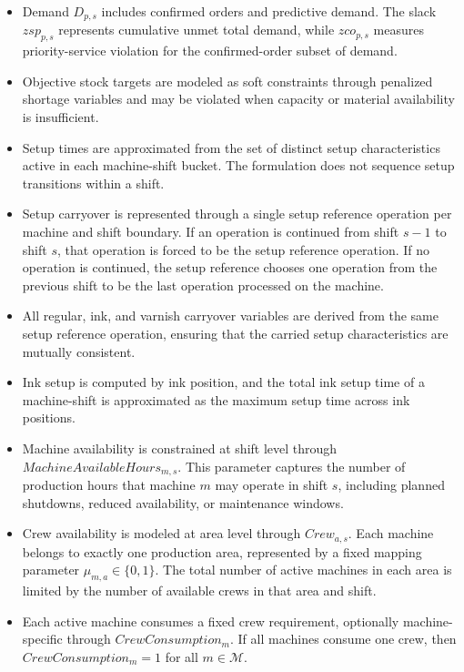 \documentclass{article}
\begin{document}
\begin{itemize}
\item Demand $D_{p,s}$ includes confirmed orders and predictive demand. The slack $zsp_{p,s}$ represents cumulative unmet total demand, while $zco_{p,s}$ measures priority-service violation for the confirmed-order subset of demand.

\item Objective stock targets are modeled as soft constraints through penalized shortage variables and may be violated when capacity or material availability is insufficient.

\item Setup times are approximated from the set of distinct setup characteristics active in each machine-shift bucket. The formulation does not sequence setup transitions within a shift.

\item Setup carryover is represented through a single setup reference operation per machine and shift boundary. If an operation is continued from shift $s-1$ to shift $s$, that operation is forced to be the setup reference operation. If no operation is continued, the setup reference chooses one operation from the previous shift to be the last operation processed on the machine.

\item All regular, ink, and varnish carryover variables are derived from the same setup reference operation, ensuring that the carried setup characteristics are mutually consistent.

\item Ink setup is computed by ink position, and the total ink setup time of a machine-shift is approximated as the maximum setup time across ink positions.

\item Machine availability is constrained at shift level through $MachineAvailableHours_{m,s}$. This parameter captures the number of production hours that machine $m$ may operate in shift $s$, including planned shutdowns, reduced availability, or maintenance windows.

\item Crew availability is modeled at area level through $Crew_{a,s}$. Each machine belongs to exactly one production area, represented by a fixed mapping parameter $\mu_{m,a} \in \{0,1\}$. The total number of active machines in each area is limited by the number of available crews in that area and shift.

\item Each active machine consumes a fixed crew requirement, optionally machine-specific through $CrewConsumption_m$. If all machines consume one crew, then $CrewConsumption_m=1$ for all $m \in \mathcal{M}$.


\end{itemize}
\end{document}

